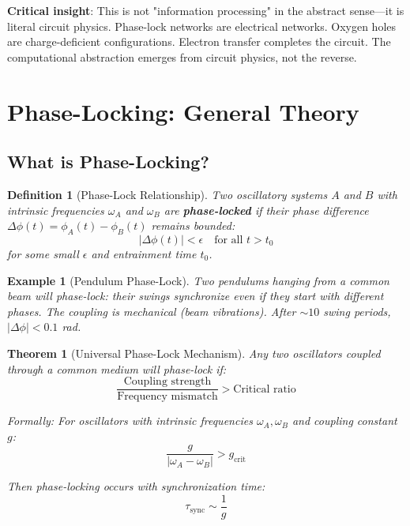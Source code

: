 \documentclass[12pt,a4paper]{article}
\newtheorem{theorem}{Theorem}
\newtheorem{definition}{Definition}
\newtheorem{example}{Example}
\begin{document}
\textbf{Critical insight}: This is not "information processing" in the abstract sense—it is literal circuit physics. Phase-lock networks are electrical networks. Oxygen holes are charge-deficient configurations. Electron transfer completes the circuit. The computational abstraction emerges from circuit physics, not the reverse.

\section{Phase-Locking: General Theory}

\subsection{What is Phase-Locking?}

\begin{definition}[Phase-Lock Relationship]
\label{def:phase_lock}
Two oscillatory systems $A$ and $B$ with intrinsic frequencies $\omega_A$ and $\omega_B$ are \textbf{phase-locked} if their phase difference $\Delta\phi(t) = \phi_A(t) - \phi_B(t)$ remains bounded:
\begin{equation}
|\Delta\phi(t)| < \epsilon \quad \text{for all } t > t_0
\end{equation}
for some small $\epsilon$ and entrainment time $t_0$.
\end{definition}

\begin{example}[Pendulum Phase-Lock]
Two pendulums hanging from a common beam will phase-lock: their swings synchronize even if they start with different phases. The coupling is mechanical (beam vibrations). After $\sim 10$ swing periods, $|\Delta\phi| < 0.1$ rad.
\end{example}

\begin{theorem}[Universal Phase-Lock Mechanism]
\label{thm:universal_phase_lock}
Any two oscillators coupled through a common medium will phase-lock if:
\begin{equation}
\frac{\text{Coupling strength}}{\text{Frequency mismatch}} > \text{Critical ratio}
\end{equation}

Formally: For oscillators with intrinsic frequencies $\omega_A, \omega_B$ and coupling constant $g$:
\begin{equation}
\frac{g}{|\omega_A - \omega_B|} > g_{\text{crit}}
\end{equation}

Then phase-locking occurs with synchronization time:
\begin{equation}
\tau_{\text{sync}} \sim \frac{1}{g}
\end{equation}
\end{theorem}
\end{document}
